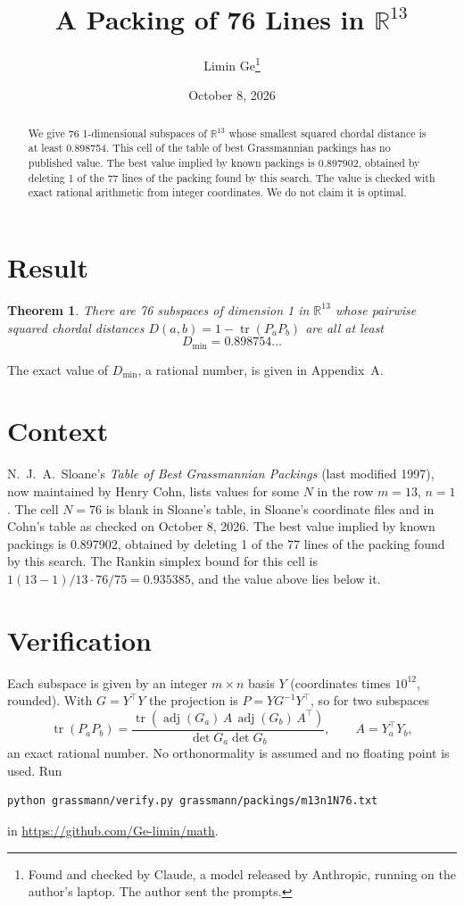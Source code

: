 \documentclass[11pt,a4paper]{article}
\title{A Packing of 76 Lines in $\mathbb{R}^{13}$}
\author{Limin Ge\thanks{Found and checked by Claude, a model released by Anthropic, running on the author's laptop. The author sent the prompts.}}
\date{October 8, 2026}
\newtheorem*{theorem}{Theorem}
\begin{document}
\maketitle
\begin{abstract}
We give 76 1-dimensional subspaces of $\mathbb{R}^{13}$ whose smallest squared chordal distance is at least 0.898754. This cell of the table of best Grassmannian packings has no published value. The best value implied by known packings is 0.897902, obtained by deleting 1 of the 77 lines of the packing found by this search. The value is checked with exact rational arithmetic from integer coordinates. We do not claim it is optimal.
\end{abstract}

\section{Result}
\begin{theorem}
There are 76 subspaces of dimension 1 in $\mathbb{R}^{13}$ whose pairwise squared chordal distances $D(a,b) = 1 - \operatorname{tr}(P_aP_b)$ are all at least
\[ D_{\min} = 0.898754\ldots \]
\end{theorem}
The exact value of $D_{\min}$, a rational number, is given in Appendix~A.


\section{Context}
N.~J.~A.~Sloane's \emph{Table of Best Grassmannian Packings} (last modified 1997), now maintained by Henry Cohn, lists values for some $N$ in the row $m=13$, $n=1$. The cell $N=76$ is blank in Sloane's table, in Sloane's coordinate files and in Cohn's table as checked on October 8, 2026. The best value implied by known packings is 0.897902, obtained by deleting 1 of the 77 lines of the packing found by this search. The Rankin simplex bound for this cell is $1(13-1)/13\cdot 76/75 = 0.935385$, and the value above lies below it.


\section{Verification}
Each subspace is given by an integer $m\times n$ basis $Y$ (coordinates times $10^{12}$, rounded). With $G=Y^\top Y$ the projection is $P=YG^{-1}Y^\top$, so for two subspaces
\[ \operatorname{tr}(P_aP_b)=\frac{\operatorname{tr}(\operatorname{adj}(G_a)\,A\,\operatorname{adj}(G_b)\,A^\top)}{\det G_a\det G_b},\qquad A=Y_a^\top Y_b, \]
an exact rational number. No orthonormality is assumed and no floating point is used. Run
\begin{verbatim}
python grassmann/verify.py grassmann/packings/m13n1N76.txt
\end{verbatim}
in \url{https://github.com/Ge-limin/math}.
\end{document}
